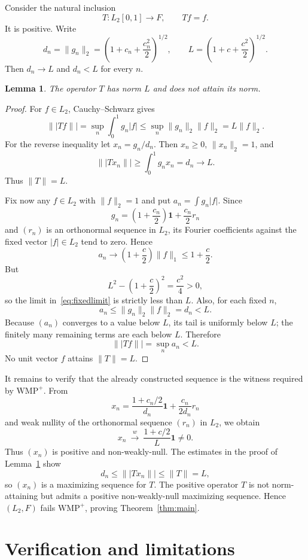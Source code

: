 \documentclass[11pt]{article}
\newtheorem{lemma}{Lemma}
\newcommand{\one}{\mathbf 1}
\newcommand{\WMP}{\mathrm{WMP}^{+}}
\begin{document}
Consider the natural inclusion
\[
 T:L_2[0,1]\longrightarrow F,\qquad Tf=f.
\]
It is positive. Write
\[
 d_n=\|g_n\|_2
 =\left(1+c_n+\frac{c_n^2}{2}\right)^{1/2},
 \qquad
 L=\left(1+c+\frac{c^2}{2}\right)^{1/2}.
\]
Then $d_n\to L$ and $d_n<L$ for every $n$.

\begin{lemma}\label{lem:operator}
The operator $T$ has norm $L$ and does not attain its norm.
\end{lemma}

\begin{proof}
For $f\in L_2$, Cauchy--Schwarz gives
\[
 \|\!|Tf\|\!|
 =\sup_n\int_0^1g_n|f|
 \leq\sup_n\|g_n\|_2\|f\|_2
 =L\|f\|_2.
\]
For the reverse inequality let $x_n=g_n/d_n$. Then $x_n\geq0$,
$\|x_n\|_2=1$, and
\[
 \|\!|Tx_n\|\!|
 \geq\int_0^1g_nx_n=d_n\longrightarrow L.
\]
Thus $\|T\|=L$.

Fix now any $f\in L_2$ with $\|f\|_2=1$ and put
$a_n=\int g_n|f|$. Since
\[
 g_n=\left(1+\frac{c_n}{2}\right)\one+\frac{c_n}{2}r_n
\]
and $(r_n)$ is an orthonormal sequence in $L_2$, its Fourier coefficients
against the fixed vector $|f|\in L_2$ tend to zero. Hence
\begin{equation}\label{eq:fixedlimit}
 a_n\longrightarrow
 \left(1+\frac c2\right)\|f\|_1
 \leq1+\frac c2.
\end{equation}
But
\[
 L^2-\left(1+\frac c2\right)^2=\frac{c^2}{4}>0,
\]
so the limit in~\eqref{eq:fixedlimit} is strictly less than $L$. Also,
for each fixed $n$,
\[
 a_n\leq\|g_n\|_2\|f\|_2=d_n<L.
\]
Because $(a_n)$ converges to a value below $L$, its tail is uniformly below
$L$; the finitely many remaining terms are each below $L$. Therefore
\[
 \|\!|Tf\|\!|=\sup_na_n<L.
\]
No unit vector $f$ attains $\|T\|=L$.
\end{proof}

It remains to verify that the already constructed sequence is the witness
required by $\WMP$. From
\[
 x_n=\frac{1+c_n/2}{d_n}\one+\frac{c_n}{2d_n}r_n
\]
and weak nullity of the orthonormal sequence $(r_n)$ in $L_2$, we obtain
\[
 x_n\ \xrightarrow{\,w\,}\ \frac{1+c/2}{L}\one\neq0.
\]
Thus $(x_n)$ is positive and non-weakly-null. The estimates in the proof of
Lemma~\ref{lem:operator} show
\[
 d_n\leq\|\!|Tx_n\|\!|\leq\|T\|=L,
\]
so $(x_n)$ is a maximizing sequence for $T$. The positive operator $T$ is
not norm-attaining but admits a positive non-weakly-null maximizing sequence.
Hence $(L_2,F)$ fails $\WMP$, proving Theorem~\ref{thm:main}.

\section{Verification and limitations}
\end{document}

